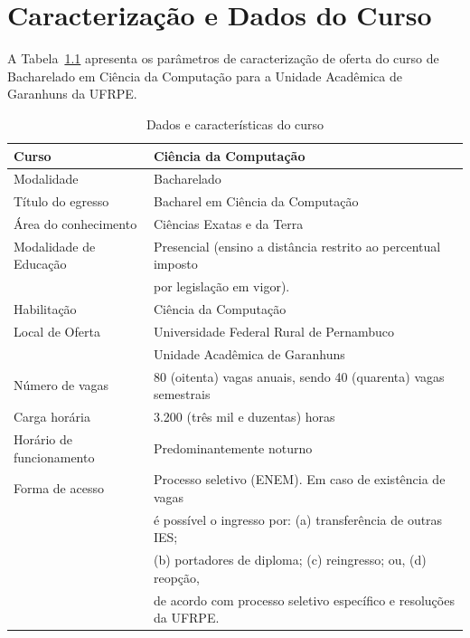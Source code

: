 \documentclass[
	12pt,				%
	openright,			%
  oneside,     %
	a4paper,			%
	english,			%
	french,				%
	spanish,			%
	brazil				%
	]{abntex2}
\begin{document}
%
%


\chapter{Caracterização e Dados do Curso}

A Tabela~\ref{ltab:DadosCaracteristicas1} apresenta os parâmetros de caracterização de oferta do curso de
Bacharelado em Ciência da Computação para a Unidade Acadêmica de Garanhuns da UFRPE.

\begin{small}
\begin{longtable}{ll}
 \caption{Dados e características do curso}
 \label{ltab:DadosCaracteristicas1}
\\
\hline
Curso & Ciência da Computação \\ 
\hline
Modalidade & Bacharelado \\ 
Título do egresso & Bacharel em Ciência da Computação \\ 
Área do conhecimento & Ciências Exatas e da Terra \\ 
Modalidade de Educação & Presencial (ensino a distância restrito ao percentual imposto \\ 
 & por legislação em vigor). \\ 
Habilitação & Ciência da Computação \\ 
Local de Oferta & Universidade Federal Rural de Pernambuco \\ 
 & Unidade Acadêmica de Garanhuns \\ 
Número de vagas & 80 (oitenta) vagas anuais, sendo 40 (quarenta) vagas semestrais \\ 
Carga horária & 3.200 (três mil e duzentas) horas \\ 
Horário de funcionamento & Predominantemente noturno \\ 
Forma de acesso & Processo seletivo (ENEM). Em caso de existência de vagas\\
 & é possível o ingresso por: (a) transferência de outras IES;\\
 & (b) portadores de diploma; (c) reingresso; ou, (d) reopção,\\
 & de acordo com  processo seletivo específico e resoluções da UFRPE. \\
\hline
\end{longtable}
\end{small}
\end{document}
